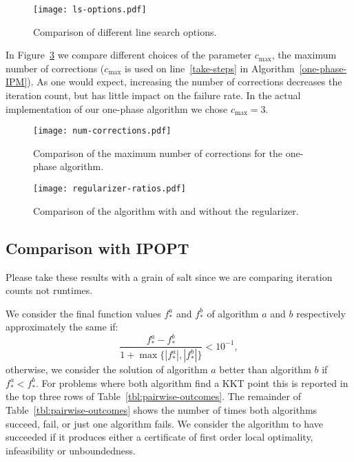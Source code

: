 \documentclass{article}
\begin{document}
\begin{figure}[H]
\texttt{[image: ls-options.pdf]}
\caption{Comparison of different line search options.}\label{fig:ls-options}
\end{figure}

In Figure~\ref{fig:num-corrections} we compare different choices of the parameter $c_{\max}$, the maximum number of corrections ($c_{\max}$ is used on line~\ref{take-steps} in Algorithm~\ref{one-phase-IPM}). As one would expect, increasing the number of corrections decreases the iteration count, but has little impact on the failure rate. In the actual implementation of our one-phase algorithm we chose $c_{\max}=3$.

\begin{figure}[H]
\texttt{[image: num-corrections.pdf]}
\caption{Comparison of the maximum number of corrections for the one-phase algorithm.}\label{fig:num-corrections}
\end{figure}


\begin{figure}[H]
\texttt{[image: regularizer-ratios.pdf]}
\caption{Comparison of the algorithm with and without the regularizer.}\label{fig:num-corrections}
\end{figure}


\subsection{Comparison with IPOPT}\label{alg:comparison-IPOPT}

Please take these results with a grain of salt since we are comparing iteration counts not runtimes.



We consider the final function values $f^{a}_{*}$ and $f^{b}_{*}$ of algorithm $a$ and $b$ respectively approximately the same if:
$$
\frac{f^{a}_{*} - f^{b}_{*}}{1 + \max \{ | f^{a}_{*} |, | f^{b}_{*} | \} } < 10^{-1},
$$
otherwise, we consider the solution of algorithm $a$ better than algorithm $b$ if $f^{a}_{*}  < f^{b}_{*}$. For problems where both algorithm find a KKT point this is reported in the top three rows of Table~\ref{tbl:pairwise-outcomes}. The remainder of Table~\ref{tbl:pairwise-outcomes} shows the number of times both algorithms succeed, fail, or just one algorithm fails. We consider the algorithm to have succeeded if it produces either a certificate of first order local optimality, infeasibility or unboundedness. 
\end{document}
